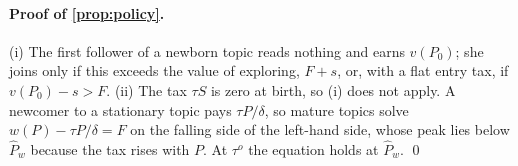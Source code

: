 \paragraph{Proof of \cref{prop:policy}.} (i) The first follower of a newborn
topic reads nothing and earns $v(P_0)$; she joins only if this exceeds the value
of exploring, $F+s$, or, with a flat entry tax, if $v(P_0)-s>F$. (ii) The tax
$\tau S$ is zero at birth, so (i) does not apply. A newcomer to a stationary topic
pays $\tau P/\delta$, so mature topics solve $w(P)-\tau P/\delta=F$ on the falling
side of the left-hand side, whose peak lies below $\hat P_w$ because the tax
rises with $P$. At $\tau^o$ the equation holds at $\hat P_w$. \qed
